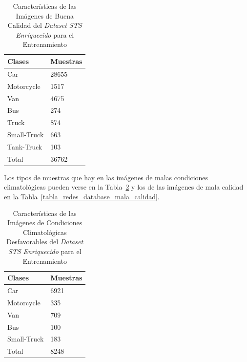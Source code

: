 \begin{table}[H]
\begin{center}
\begin{tabular}{|l|l|}
\hline
Clases & Muestras \\
\hline \hline
Car & 28655 \\ \hline
Motorcycle & 1517 \\ \hline
Van & 4675 \\ \hline
Bus & 274 \\ \hline
Truck & 874 \\ \hline
Small-Truck & 663 \\ \hline
Tank-Truck & 103 \\ \hline
Total & 36762 \\ \hline
\end{tabular}
\caption{Características de las Imágenes de Buena Calidad del \textit{Dataset STS Enriquecido} para el Entrenamiento}
\label{tabla_redes_database_mayor}
\end{center}
\end{table}

Los tipos de muestras que hay en las imágenes de malas condiciones climatológicas pueden verse en la Tabla~\ref{tabla_redes_database_malas_condiciones} y los de las imágenes de mala calidad en la Tabla~\ref{tabla_redes_database_mala_calidad}.

\begin{table}[H]
\begin{center}
\begin{tabular}{|l|l|}
\hline
Clases & Muestras \\
\hline \hline
Car & 6921 \\ \hline
Motorcycle & 335 \\ \hline
Van & 709 \\ \hline
Bus & 100 \\ \hline
Small-Truck & 183 \\ \hline
Total & 8248 \\ \hline
\end{tabular}
\caption{Características de las Imágenes de Condiciones Climatológicas Desfavorables del \textit{Dataset STS Enriquecido} para el Entrenamiento}
\label{tabla_redes_database_malas_condiciones}
\end{center}
\end{table}

